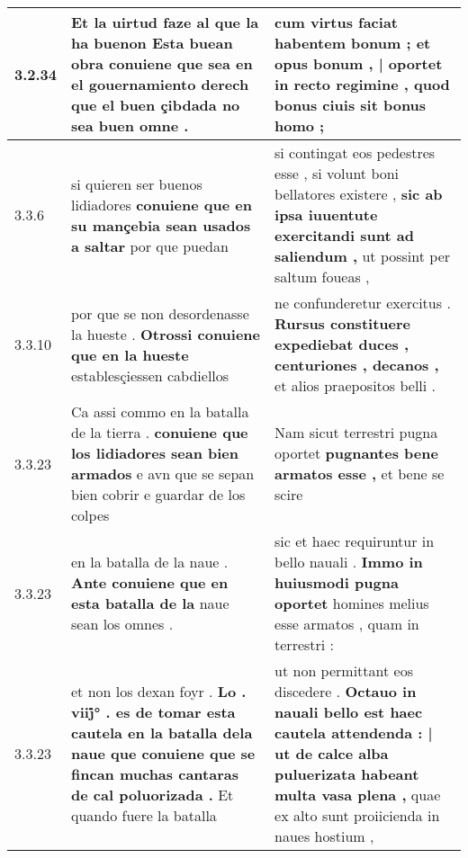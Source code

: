 \begin{tabular}{|p{1cm}|p{6.5cm}|p{6.5cm}|}
3.2.34 & Et la uirtud faze al que la ha buenon \textbf{ Esta buean obra conuiene que sea en el gouernamiento derech } que el buen çibdada no sea buen omne . & cum virtus faciat habentem bonum ; \textbf{ et opus bonum , | oportet in recto regimine , } quod bonus ciuis sit bonus homo ; \\\hline
3.3.6 & si quieren ser buenos lidiadores \textbf{ conuiene que en su mançebia sean usados a saltar } por que puedan & si contingat eos pedestres esse , si volunt boni bellatores existere , \textbf{ sic ab ipsa iuuentute exercitandi sunt ad saliendum , } ut possint per saltum foueas , \\\hline
3.3.10 & por que se non desordenasse la hueste . \textbf{ Otrossi conuiene que en la hueste } establesçiessen cabdiellos & ne confunderetur exercitus . \textbf{ Rursus constituere expediebat duces , centuriones , decanos , } et alios praepositos belli . \\\hline
3.3.23 & Ca assi commo en la batalla de la tierra . \textbf{ conuiene que los lidiadores sean bien armados } e avn que se sepan bien cobrir e guardar de los colpes & Nam sicut terrestri pugna oportet \textbf{ pugnantes bene armatos esse , } et bene se scire \\\hline
3.3.23 & en la batalla de la naue . \textbf{ Ante conuiene que en esta batalla de la } naue sean los omnes . & sic et haec requiruntur in bello nauali . \textbf{ Immo in huiusmodi pugna oportet } homines melius esse armatos , quam in terrestri : \\\hline
3.3.23 & et non los dexan foyr . \textbf{ Lo . viij̇° . es de tomar esta cautela en la batalla dela naue que conuiene que se fincan muchas cantaras de cal poluorizada . } Et quando fuere la batalla & ut non permittant eos discedere . \textbf{ Octauo in nauali bello est haec cautela attendenda : | ut de calce alba puluerizata habeant multa vasa plena , } quae ex alto sunt proiicienda in naues hostium , \\\hline

\end{tabular}
